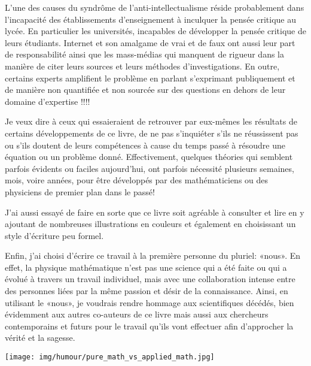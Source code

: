	\begin{tcolorbox}[title=Remark,colframe=black,arc=10pt]
	L'une des causes du syndrôme de l'anti-intellectualisme réside probablement dans l'incapacité des établissements d'enseignement à inculquer la pensée critique au lycée. En particulier les universités, incapables de développer la pensée critique de leurs étudiants. Internet et son amalgame de vrai et de faux ont aussi leur part de responsabilité ainsi que les mass-médias qui manquent de rigueur dans la manière de citer leurs sources et leurs méthodes d'investigations. En outre, certains experts amplifient le problème en parlant s'exprimant publiquement et de manière non quantifiée et non sourcée sur des questions en dehors de leur domaine d'expertise !!!!
	\end{tcolorbox}
	Je veux dire à ceux qui essaieraient de retrouver par eux-mêmes les résultats de certains développements de ce livre, de ne pas s'inquiéter s'ils ne réussissent pas ou s'ils doutent de leurs compétences à cause du temps passé à résoudre une équation ou un problème donné. Effectivement, quelques théories qui semblent parfois évidents ou faciles aujourd'hui, ont parfois nécessité plusieurs semaines, mois, voire années, pour être développés par des mathématiciens ou des physiciens de premier plan dans le passé!
	
	J'ai aussi essayé de faire en sorte que ce livre soit agréable à consulter et lire en y ajoutant de nombreuses illustrations en couleurs et également en choisissant un style d'écriture peu formel.
	
	Enfin, j'ai choisi d'écrire ce travail à la première personne du pluriel: «nous». En effet, la physique mathématique n'est pas une science qui a été faite ou qui a évolué à travers un travail individuel, mais avec une collaboration intense entre des personnes liées par la même passion et désir de la connaissance. Ainsi, en utilisant le «nous», je voudrais rendre hommage aux scientifiques décédés, bien évidemment aux autres co-auteurs de ce livre mais aussi aux chercheurs contemporains et futurs pour le travail qu'ils vont effectuer afin d'approcher la vérité et la sagesse.
	
	\begin{center}
	\texttt{[image: img/humour/pure\_math\_vs\_applied\_math.jpg]}
	\end{center}

	\newpage
	\thispagestyle{empty}
	\mbox{}
